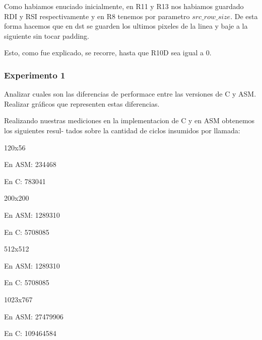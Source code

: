 Como habiamos enuciado inicialmente, en R11 y R13 nos habiamos guardado RDI y RSI respectivamente y en R8 tenemos por parametro
$src\_row\_size$. De esta forma hacemos que en dst se guarden los ultimos pixeles de la linea y baje a la siguiente sin tocar padding.\newline

Esto, como fue explicado, se recorre, hasta que R10D sea igual a 0.


\vspace*{0.3cm} \noindent
\subsubsection{Experimento 1}

  Analizar cuales son las diferencias de performace entre las versiones de C y ASM. 
  Realizar gráficos que representen estas diferencias.\vspace*{0.3cm} \noindent
  
Realizando nuestras mediciones en la implementacion de C y en ASM obtenemos los siguientes resul-
tados sobre la cantidad de ciclos insumidos por llamada:
  \vspace*{0.3cm} \noindent
  

  
120x56

En ASM: 234468

En C: 783041

\vspace*{0.3cm} \noindent
200x200

En ASM: 1289310

En C: 5708085

\vspace*{0.3cm} \noindent
512x512

En ASM: 1289310

En C: 5708085

\vspace*{0.3cm} \noindent
1023x767

En ASM: 27479906

En C: 109464584


 \vspace*{0.3cm}
 
